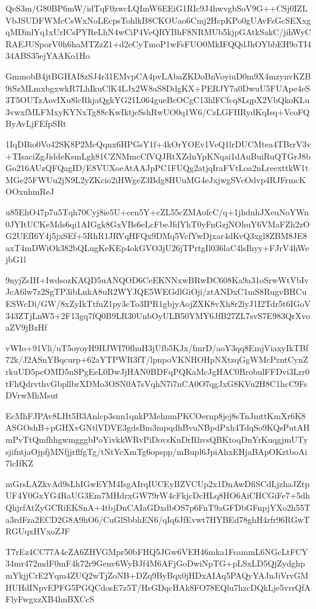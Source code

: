 \documentclass[]{article}
\newenvironment{Shaded}{\begin{snugshade}}{\end{snugshade}}
\newcommand{\NormalTok}[1]{#1}
\begin{document}
\begin{Shaded}
\begin{Highlighting}[]
\NormalTok{QeS3m/G80BP6mW/idTqF0zwcLQImW6EEiG1RIc9J4hwvgbSoV9G++CSj0IZLVbJSUDFWMcCsWxNoLEcpsTohlkB8CKOUao6Cmj2HcpKPo0gUAvFsGcSEXxgqMDinlYq1xUrICsPYReLhN4wCiP4VeQRYBhF8NRMUb5kjpGAtkSakC/jihWyCRAEJUSporV0h6haMTZzZ1+d2eCyTmoP1wFsFUO0MkIFQQdJhOYbbEH9oTI434ABS35ejYAAKo1Ho}

\NormalTok{GmmobB4jtBGHAI8zSJ4r31EMvpCA4pvLAbaZKDoBnVoyiuD0m9X4mzynvKZB9iSzMLmxbgxwkR7LhIkuClK4LJx2W8aS8DdgKX+PERJY7a0DwuU5FUApe4eS3T5OUTzAovIXu8lcRkjaQgkYG21L064gueBcOCgC13hlFCfcq8LqpX2VbQkoKLu3vwxfMLFMxyKYNxTg88cKwIktjeSshRwUO0q1W6/CzLGFHRydKqIsq+VcoFQByAvLjFEfpSRt}

\NormalTok{1IqDBio0Vo42SK8P2McQqnx6HPGsY1f+4kOrYOEv1VeQ1lrDUCMtea4TBrrV3v+TIsaciZgJiddeKsmLgk81CZNMmcCfVQJRtXZdnYpKNqai1dAuBuiRuQTGrJ8bGo216AUzQFQagID/E8VUXoeAtAAJpPC1FUQg2atjqIraFVtLoa2nLreexttkW1tMGe25FWUu2jN9L2yZKcio2iHWgeZ3Bdg8HUuMG4eJxjwgSVcOdvp4RJFrmcKOOxuhmReJ}

\NormalTok{u85EhO47p7u5Tqh70Cyj8ie5U+cen5Y+cZL55cZMAofcC/q+1jhdnhJXeuNoYWn0JYItUCKeMds6qi1AIGgk8GxVBs6eLcFbeJfdYhT0yFnGzjNOhuY6VMaFZh2zOG2UEfI6Y4j5jxSEf+5RhR1JRVqHFQx9DMq5VcfYwDjxar4dKvQ3xgl8ZBM8JE8axT4mDWiOk382bQLugKeKEp4okGVO3jU26jTPrtgIl036laC4lsIhyy+FJrV4hWejbG1l}

\NormalTok{9nyjZsIH+IwdsozKAQD5uANQOD6CeEKNNxwBRwDC608Ka9a31oSrwWtVbIvJcA6lw7z2SgTP3ibLnkA8uR2WYJQE5WEGdlGiOji/ztANDxC1mS8RugvBHCuESWcDi/GW/8xZyIkTtfuZ1py3cTo3IPR1gbjyAojZXK8vXh8r2lyJ1I2Tdr5t6IGoV343ZTjLnW5+2F13gq7fQ0B9LR30UnbOyULB50YMY6JfB27ZL7svS7E983QrXvoaZV9jBzHf}

\NormalTok{vWIo+91Vli/uT5oyoyH9HJWI70fhuH3jUfb5KJx/fmrD/aoY3qq8EmjViaxyIkTBf72k/J2ASnYBqcurp+62aYTPWR3fT/lpnpoVKNHOHpNXtzqGgWMcPzntCynZrkuUD5pcOMD5nSPgEeL0DwJjHAN0BDFqPQKaMcJgHAC0BrobulFFDvi3Lrr0tFhQdrvthvGbpllbrXDMo3OSN0A7sVqhN7i7nCA0O7qgJxG8KVu2H8C1hcC9FsDVrwMhMsut}

\NormalTok{EcMhFJPAv8LHt5B3Anlcp3snn1qnkPMehnmPKCOernp8jej8sTnJmttKmXr6K8ASGOshB+pGHXvGNtlVDVE3gdsBm3mpqdhBvuNBpdPxh4TdqSo9KQsPutAHmPvTtQmfhhgwmgggbPoYivkkWRvPiDovsKuDrRhvsQBKtoqDnYrKuqgjmUTysjifntjaOjpfjMNfjjrflfgTg/tNtYcXmTg6opspp/mBupl6JpiAhxEHjaBApOKztboAi7lcIfKZ}

\NormalTok{mGrsLAZkvAd9sLhIGwEYM4IsgAIrqIUCEyBZVCUp2x1DnAwDfiSCdLjzhaJZtpUF4Y0GxYG4RaUG3Em7MHdrxGW79rW4cFkjcDcHLq8HO6AiCHCGiFe7+5dhQhjrfAtZyGCRiEKSnA+4tbjDnCAIaGDxdbOS7p6FnT9aGFDbGFnpjYXo2h55Ta3rdFza2ECD2G8A9hO6/CuGlSbbhEN6/qIq6JfEvwt7HYBEd78ghH4rfr96RGwTRGUqxHVxoZJF}

\NormalTok{T7rEz4CC77A4cZA6ZHVGMpr50bFHQ5JGw6VEH46mka1FsammL6NGcLtFCY34mr472mdF0mF4k72r9Genv6WyBJf4M6AFjGoDwiNpTG+pLSxLD5QjZydghpmYkjjCrE2Yqm4ZUQ2wTjZoNB+DZq9ByBqx0jHDxAIAq5PAQyYAJnJiVrvGMHUHdINpvEPFG5PGQCdosE7z5T/HsGDqcHAk8FO78EQlu7hzcDQkLje5vrrQfAFlyFwgxzXB4hnBXCcS}


\end{Highlighting}
\end{Shaded}
\end{document}
